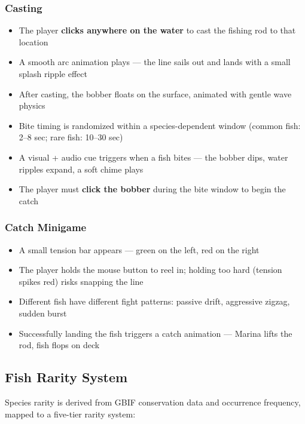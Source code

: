 \documentclass[11pt, letterpaper]{article}
\begin{document}
\subsubsection{Casting}
\begin{itemize}
  \item The player \textbf{clicks anywhere on the water} to cast the fishing rod to that location
  \item A smooth arc animation plays --- the line sails out and lands with a small splash ripple effect
  \item After casting, the bobber floats on the surface, animated with gentle wave physics
  \item Bite timing is randomized within a species-dependent window (common fish: 2--8 sec; rare fish: 10--30 sec)
  \item A visual + audio cue triggers when a fish bites --- the bobber dips, water ripples expand, a soft chime plays
  \item The player must \textbf{click the bobber} during the bite window to begin the catch
\end{itemize}

\subsubsection{Catch Minigame}
\begin{itemize}
  \item A small tension bar appears --- green on the left, red on the right
  \item The player holds the mouse button to reel in; holding too hard (tension spikes red) risks snapping the line
  \item Different fish have different fight patterns: passive drift, aggressive zigzag, sudden burst
  \item Successfully landing the fish triggers a catch animation --- Marina lifts the rod, fish flops on deck
\end{itemize}

\subsection{Fish Rarity System}

Species rarity is derived from GBIF conservation data and occurrence frequency, mapped to a five-tier rarity system:
\end{document}
